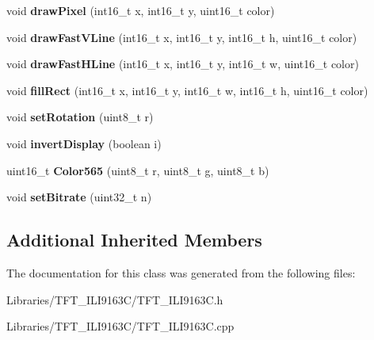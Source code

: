 \begin{DoxyCompactItemize}
\item 
\hypertarget{class_t_f_t___i_l_i9163_c_a87c211c0992f536a05d70d6e5a741b54}{}void {\bfseries draw\+Pixel} (int16\+\_\+t x, int16\+\_\+t y, uint16\+\_\+t color)\label{class_t_f_t___i_l_i9163_c_a87c211c0992f536a05d70d6e5a741b54}

\item 
\hypertarget{class_t_f_t___i_l_i9163_c_a0574f52b39da9ed3d137faabeb03ca9c}{}void {\bfseries draw\+Fast\+V\+Line} (int16\+\_\+t x, int16\+\_\+t y, int16\+\_\+t h, uint16\+\_\+t color)\label{class_t_f_t___i_l_i9163_c_a0574f52b39da9ed3d137faabeb03ca9c}

\item 
\hypertarget{class_t_f_t___i_l_i9163_c_af55357ff91925f936e0d9f061118ffb5}{}void {\bfseries draw\+Fast\+H\+Line} (int16\+\_\+t x, int16\+\_\+t y, int16\+\_\+t w, uint16\+\_\+t color)\label{class_t_f_t___i_l_i9163_c_af55357ff91925f936e0d9f061118ffb5}

\item 
\hypertarget{class_t_f_t___i_l_i9163_c_acd16c312bfdc8c6c8d96608481ade098}{}void {\bfseries fill\+Rect} (int16\+\_\+t x, int16\+\_\+t y, int16\+\_\+t w, int16\+\_\+t h, uint16\+\_\+t color)\label{class_t_f_t___i_l_i9163_c_acd16c312bfdc8c6c8d96608481ade098}

\item 
\hypertarget{class_t_f_t___i_l_i9163_c_ab2f9cc69c850f9402e7317f3d1b5859f}{}void {\bfseries set\+Rotation} (uint8\+\_\+t r)\label{class_t_f_t___i_l_i9163_c_ab2f9cc69c850f9402e7317f3d1b5859f}

\item 
\hypertarget{class_t_f_t___i_l_i9163_c_a88bec0eec20b1040b2b919c934e9b677}{}void {\bfseries invert\+Display} (boolean i)\label{class_t_f_t___i_l_i9163_c_a88bec0eec20b1040b2b919c934e9b677}

\item 
\hypertarget{class_t_f_t___i_l_i9163_c_a35bbfbee42998ce50866fa99b564d3d3}{}uint16\+\_\+t {\bfseries Color565} (uint8\+\_\+t r, uint8\+\_\+t g, uint8\+\_\+t b)\label{class_t_f_t___i_l_i9163_c_a35bbfbee42998ce50866fa99b564d3d3}

\item 
\hypertarget{class_t_f_t___i_l_i9163_c_ad12a0488c5d231ae9d901895589aa42f}{}void {\bfseries set\+Bitrate} (uint32\+\_\+t n)\label{class_t_f_t___i_l_i9163_c_ad12a0488c5d231ae9d901895589aa42f}

\end{DoxyCompactItemize}
\subsection*{Additional Inherited Members}


The documentation for this class was generated from the following files\+:\begin{DoxyCompactItemize}
\item 
Libraries/\+T\+F\+T\+\_\+\+I\+L\+I9163\+C/T\+F\+T\+\_\+\+I\+L\+I9163\+C.\+h\item 
Libraries/\+T\+F\+T\+\_\+\+I\+L\+I9163\+C/T\+F\+T\+\_\+\+I\+L\+I9163\+C.\+cpp\end{DoxyCompactItemize}

